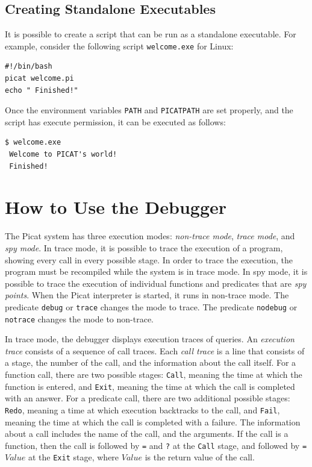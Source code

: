 \subsection{Creating Standalone Executables}
It is possible to create a script that can be run as a standalone executable. For example, consider the following script \texttt{welcome.exe} for Linux:

\begin{verbatim}
#!/bin/bash          
picat welcome.pi
echo " Finished!"
\end{verbatim}
Once the environment variables \texttt{PATH} and \texttt{PICATPATH} are set properly, and the script has execute permission, it can be executed as follows:

\begin{verbatim}
$ welcome.exe 
 Welcome to PICAT's world! 
 Finished!
\end{verbatim}

\section{How to Use the Debugger}
The Picat system has three execution modes: \textit{non-trace mode}, \textit{trace mode}, and \textit{spy mode}.  In trace mode, it is possible to trace the execution of a program, showing every call in every possible stage.  In order to trace the execution, the program must be recompiled while the system is in trace mode.  In spy mode, it is possible to trace the execution of individual functions and predicates that are {\it spy points}. When the Picat interpreter is started, it runs in non-trace mode. The predicate \texttt{debug} or \texttt{trace}  changes the mode to trace. The predicate \texttt{nodebug} or \texttt{notrace} changes the mode to non-trace.

In trace mode, the debugger displays execution traces of queries. An \emph{execution trace} consists of a sequence of call traces. Each \emph{call trace} is a line that consists of a stage, the number of the call, and the information about the call itself. For a function call, there are two possible stages: \texttt{Call}, meaning the time at which the function is entered, and \texttt{Exit},  meaning the time at which the call is completed with an answer. For a predicate call, there are two additional possible stages: \texttt{Redo}, meaning a time at which execution backtracks to the call, and \texttt{Fail}, meaning the time at which the call is completed with a failure. The information about a call includes the name of the call, and the arguments. If the call is a function, then the call is followed by \texttt{=} and \texttt{?} at the \texttt{Call} stage, and followed by \texttt{= $Value$} at the \texttt{Exit} stage, where $Value$ is the return value of the call. 

